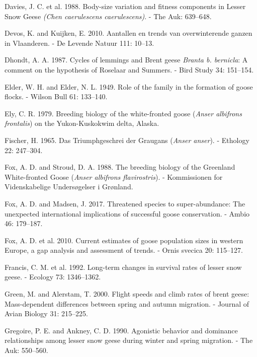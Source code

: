 \documentclass[10pt,twocolumn]{paper}
\begin{document}
\hypertarget{ref-davies1988body}{}
Davies, J. C. et al. 1988. Body-size variation and fitness components in
Lesser Snow Geese \emph{(Chen caerulescens caerulescens)}. - The Auk:
639--648.

\hypertarget{ref-devos2010aantallen}{}
Devos, K. and Kuijken, E. 2010. Aantallen en trends van overwinterende
ganzen in Vlaanderen. - De Levende Natuur 111: 10--13.

\hypertarget{ref-dhondt1987cycles}{}
Dhondt, A. A. 1987. Cycles of lemmings and Brent geese \emph{Branta b.
bernicla}: A comment on the hypothesis of Roselaar and Summers. - Bird
Study 34: 151--154.

\hypertarget{ref-elder1949role}{}
Elder, W. H. and Elder, N. L. 1949. Role of the family in the formation
of goose flocks. - Wilson Bull 61: 133--140.

\hypertarget{ref-ely1979breeding}{}
Ely, C. R. 1979. Breeding biology of the white-fronted goose
(\emph{Anser albifrons frontalis}) on the Yukon-Kuskokwim delta, Alaska.

\hypertarget{ref-fischer1965triumphgeschrei}{}
Fischer, H. 1965. Das Triumphgeschrei der Graugans (\emph{Anser anser}).
- Ethology 22: 247--304.

\hypertarget{ref-fox1988breeding}{}
Fox, A. D. and Stroud, D. A. 1988. The breeding biology of the Greenland
White-fronted Goose (\emph{Anser albifrons flavirostris}). -
Kommissionen for Videnskabelige Undersøgelser i Grønland.

\hypertarget{ref-Fox2017a}{}
Fox, A. D. and Madsen, J. 2017. Threatened species to super-abundance:
The unexpected international implications of successful goose
conservation. - Ambio 46: 179--187.

\hypertarget{ref-fox2010current}{}
Fox, A. D. et al. 2010. Current estimates of goose population sizes in
western Europe, a gap analysis and assessment of trends. - Ornis svecica
20: 115--127.

\hypertarget{ref-francis1992survival}{}
Francis, C. M. et al. 1992. Long-term changes in survival rates of
lesser snow geese. - Ecology 73: 1346--1362.

\hypertarget{ref-JAV:JAV310213}{}
Green, M. and Alerstam, T. 2000. Flight speeds and climb rates of brent
geese: Mass-dependent differences between spring and autumn migration. -
Journal of Avian Biology 31: 215--225.

\hypertarget{ref-gregoire1990agonistic}{}
Gregoire, P. E. and Ankney, C. D. 1990. Agonistic behavior and dominance
relationships among lesser snow geese during winter and spring
migration. - The Auk: 550--560.
\end{document}
